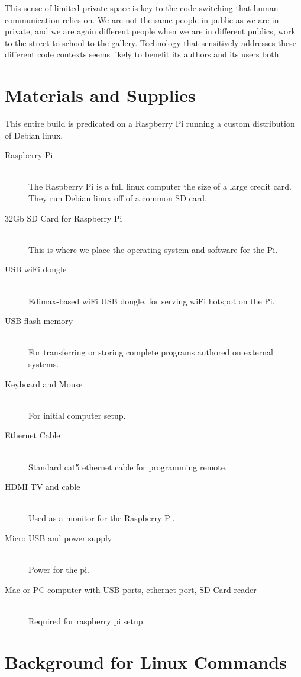 This sense of limited private space is key to the code-switching that human communication relies on. We are not the same people in public as we are in private, and we are again different people when we are in different publics, work to the street to school to the gallery. Technology that sensitively addresses these different code contexts seems likely to benefit its authors and its users both.


\section{Materials and Supplies}

This entire build is predicated on a Raspberry Pi running a custom distribution of Debian linux.
\begin{description}
\item [Raspberry Pi] \hfill \\
	The Raspberry Pi is a full linux computer the size of a large credit card. They run Debian linux off of a common SD card.
\item [32Gb SD Card for Raspberry Pi] \hfill \\
	This is where we place the operating system and software for the Pi.
\item [USB wiFi dongle] \hfill \\
	Edimax-based wiFi USB dongle, for serving wiFi hotspot on the Pi.
\item [USB flash memory] \hfill \\
	For transferring or storing complete programs authored on external systems.
\item [Keyboard and Mouse] \hfill \\
	For initial computer setup.
\item [Ethernet Cable] \hfill \\
	Standard cat5 ethernet cable for programming remote.
\item [HDMI TV and cable] \hfill \\
	Used as a monitor for the Raspberry Pi.
\item [Micro USB and power supply] \hfill \\
	Power for the pi.
\item [Mac or PC computer with USB ports, ethernet port, SD Card reader] \hfill \\
	Required for raspberry pi setup.
\end{description}

\section{Background for Linux Commands}

